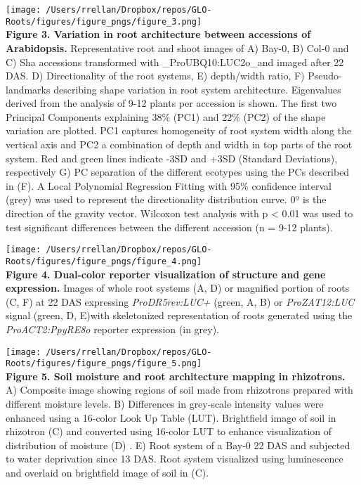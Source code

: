 \documentclass[]{article}
\begin{document}
\pagebreak

\texttt{[image: /Users/rrellan/Dropbox/repos/GLO-Roots/figures/figure\_pngs/figure\_3.png]}\\\textbf{Figure
3. Variation in root architecture between accessions of Arabidopsis.}
Representative root and shoot images of A) Bay-0, B) Col-0 and C) Sha
accessions transformed with \_ProUBQ10:LUC2o\_and imaged after 22 DAS.
D) Directionality of the root systems, E) depth/width ratio, F)
Pseudo-landmarks describing shape variation in root system architecture.
Eigenvalues derived from the analysis of 9-12 plants per accession is
shown. The first two Principal Components explaining 38\% (PC1) and 22\%
(PC2) of the shape variation are plotted. PC1 captures homogeneity of
root system width along the vertical axis and PC2 a combination of depth
and width in top parts of the root system. Red and green lines indicate
-3SD and +3SD (Standard Deviations), respectively G) PC separation of
the different ecotypes using the PCs described in (F). A Local
Polynomial Regression Fitting with 95\% confidence interval (grey) was
used to represent the directionality distribution curve. 0º is the
direction of the gravity vector. Wilcoxon test analysis with p
\textless{} 0.01 was used to test significant differences between the
different accession (n = 9-12 plants).

\pagebreak

\texttt{[image: /Users/rrellan/Dropbox/repos/GLO-Roots/figures/figure\_pngs/figure\_4.png]}\\\textbf{Figure
4. Dual-color reporter visualization of structure and gene expression.}
Images of whole root systems (A, D) or magnified portion of roots (C, F)
at 22 DAS expressing \emph{ProDR5rev:LUC+} (green, A, B) or
\emph{ProZAT12:LUC} signal (green, D, E)with skeletonized representation
of roots generated using the \emph{ProACT2:PpyRE8o} reporter expression
(in grey).

\pagebreak

\texttt{[image: /Users/rrellan/Dropbox/repos/GLO-Roots/figures/figure\_pngs/figure\_5.png]}\\\textbf{Figure
5. Soil moisture and root architecture mapping in rhizotrons.} A)
Composite image showing regions of soil made from rhizotrons prepared
with different moisture levels. B) Differences in grey-scale intensity
values were enhanced using a 16-color Look Up Table (LUT). Brightfield
image of soil in rhizotron (C) and converted using 16-color LUT to
enhance visualization of distribution of moisture (D) . E) Root system
of a Bay-0 22 DAS and subjected to water deprivation since 13 DAS. Root
system visualized using luminescence and overlaid on brightfield image
of soil in (C).
\end{document}
